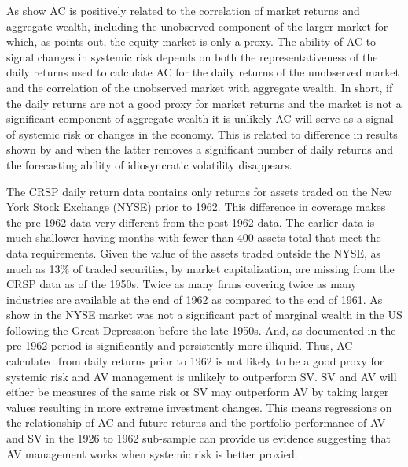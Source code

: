 
As \citet{pollet_average_2010} show AC is positively related to the correlation of market returns and aggregate wealth, including the unobserved component of the larger market for which, as \citet{roll_critique_1977} points out, the equity market is only a proxy. The ability of AC to signal changes in systemic risk depends on both the representativeness of the daily returns used to calculate AC for the daily returns of the unobserved market and the correlation of the unobserved market with aggregate wealth. In short, if the daily returns are not a good proxy for market returns and the market is not a significant component of aggregate wealth it is unlikely AC will serve as a signal of systemic risk or changes in the economy. This is related to difference in results shown by \citet{goyal_idiosyncratic_2003} and \citet{bali_does_nodate} when the latter removes a significant number of daily returns and the forecasting ability of idiosyncratic volatility disappears.

The CRSP daily return data contains only returns for assets traded on the New York Stock Exchange (NYSE) prior to 1962. This difference in coverage makes the pre-1962 data very different from the post-1962 data. The earlier data is much shallower having months with fewer than 400 assets total that meet the data requirements. Given the value of the assets traded outside the NYSE, as much as 13\% of traded securities, by market capitalization, are missing from the CRSP data as of the 1950s. \citep{nyse_history,staff_american_2003} Twice as many firms covering twice as many industries are available at the end of 1962 as compared to the end of 1961. As show in \citet{taylor_2014} the NYSE market was not a significant part of marginal wealth in the US following the Great Depression before the late 1950s. And, as documented in \citet{jones_century_2002} the pre-1962 period is significantly and persistently more illiquid. Thus, AC calculated from daily returns prior to 1962 is not likely to be a good proxy for systemic risk and AV management is unlikely to outperform SV. SV and AV will either be measures of the same risk or SV may outperform AV by taking larger values resulting in more extreme investment changes. This means regressions on the relationship of AC and future returns and the portfolio performance of AV and SV in the 1926 to 1962 sub-sample can provide us evidence suggesting that AV management works when systemic risk is better proxied.